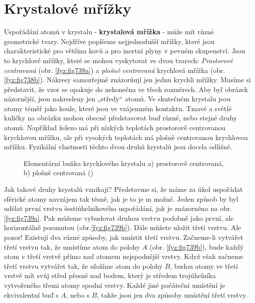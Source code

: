   \section{Krystalové mřížky}\label{fyz:IIchapXXXsecIV}
    Uspořádání atomů v krystalu - \textbf{krystalová mřížka} - může mít různé geometrické tvary. 
    Nejdříve popíšeme nejjednodušší mřížky, které jsou charakteristické pro většinu kovů a pro 
    inertní plyny v pevném skupenství. Jsou to krychlové mřížky, které se mohou vyskytovat ve dvou 
    tvarech: \emph{Prostorově centrovaná} (obr. \ref{fyz:fig738a}) a \emph{plošně centrovaná} 
    krychlová mřížka (obr. \ref{fyz:fig738b}). Nákresy samozřejmě znázorňují jen jednu krychli 
    mřížky. Musíme si představit, že vzor se opakuje do nekonečna ve třech rozměrech. Aby byl 
    obrázek názornější, jsou nakresleny jen „středy“ atomů. Ve skutečném krystalu jsou atomy téměř 
    jako koule, které jsou ve vzájemném kontaktu. Tmavé a světlé kuličky na obrázku mohou obecně 
    představovat buď různé, nebo stejné druhy atomů. Například železo má při nízkých teplotách 
    prostorově centrovanou krychlovou mřížku, ale při vysokých teplotách má plošně centrovanou 
    krychlovou mřížku. Fyzikální vlastnosti těchto dvou druhů krystalů jsou docela odlišné.
    
    \begin{figure}[ht!]   %
      \centering
      \label{fyz:fig738}
      \caption{Elementární buňka krychlového krystalu a) prostorově centrovaná, b) plošně centrovaná
               (\cite[s.~547]{Feynman02})}
    \end{figure}
    
    Jak takové druhy krystalů vznikají? Představme si, že máme za úkol uspořádat sférické atomy 
    navzájem tak těsně, jak je to je m možné. Jeden způsob by byl udělat první vrstvu 
    šestiúhelníkového uspořádání, jak je znázorněno na obr. \ref{fyz:fig739a}. Pak můžeme vybudovat 
    druhou vrstvu podobně jako první, ale horizontálně posunutou (obr.\ref{fyz:fig739b}). Dále 
    můžete uložit třetí vrstvu. Ale pozor! Existují dva různé způsoby, jak umístit třetí vrstvu. 
    Začneme-li vytvářet třetí vrstvu tak, že umístíme atom do polohy \(A\) (obr. 
    \ref{fyz:fig739b}), bude každý atom v třetí vrstvě přímo nad atomem nejspodnější vrstvy. Když 
    však začneme třetí vrstvu vytvářet tak, že uložíme atom do polohy \(B\), budou atomy ve třetí 
    vrstvě mít svůj střed přesně nad bodem, který je středem trojúhelníka vytvořeného třemi atomy 
    spodní vrstvy. Každé jiné počáteční umístění je ekvivalentní buď s \(A\), nebo s \(B\), takže 
    jsou jen dva způsoby umístění třetí vrstvy.
    
